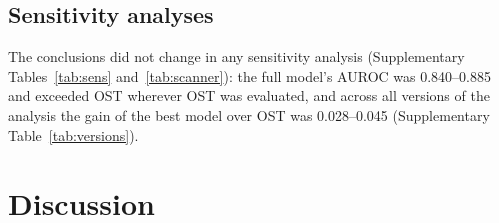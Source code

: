 \documentclass[11pt,a4paper]{article}
\begin{document}
\begin{table}[!htbp]
\centering
\caption{Performance in clinical strata of the temporal validation set. AUROC of each model; $\Delta$, full model minus OST (paired bootstrap 95\% CI). The last two columns give cases detected and the proportion referred by the full model at its global Youden threshold (4.8\%) and by OST $<2$ (no fitting). Exploratory; not part of the testing hierarchy.}
\label{tab:strata}
\footnotesize
\setlength{\tabcolsep}{3pt}
\end{table}


\subsection{Sensitivity analyses}
The conclusions did not change in any sensitivity analysis (Supplementary Tables~\ref{tab:sens} and~\ref{tab:scanner}): the full model's AUROC was 0.840--0.885 and exceeded OST wherever OST was evaluated, and across all versions of the analysis the gain of the best model over OST was 0.028--0.045 (Supplementary Table~\ref{tab:versions}).

\section{Discussion}
\end{document}
